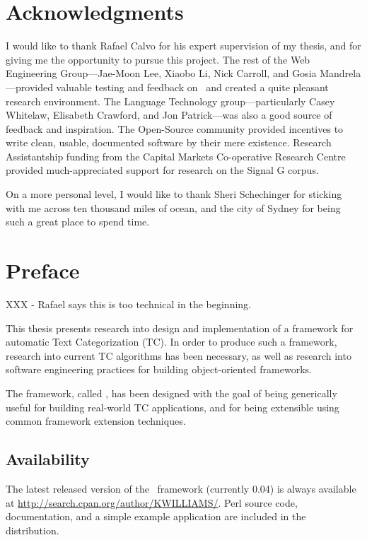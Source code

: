 \chapter{Acknowledgments}

I would like to thank Rafael Calvo for his expert supervision of my
thesis, and for giving me the opportunity to pursue this project.  The
rest of the Web Engineering Group---Jae-Moon Lee, Xiaobo Li, Nick
Carroll, and Gosia Mandrela---provided valuable testing and feedback
on \aicat\ and created a quite pleasant research environment.  The
Language Technology group---particularly Casey Whitelaw, Elisabeth
Crawford, and Jon Patrick---was also a good source of feedback and
inspiration.  The Open-Source community provided incentives to write
clean, usable, documented software by their mere existence.  Research
Assistantship funding from the Capital Markets Co-operative Research
Centre provided much-appreciated support for research on the Signal G
corpus.

On a more personal level, I would like to thank Sheri Schechinger for sticking
with me across ten thousand miles of ocean, and the city of Sydney for
being such a great place to spend time.

\chapter{Preface}

XXX - Rafael says this is too technical in the beginning.

This thesis presents research into design and implementation of a framework
for automatic Text Categorization (TC).  In order to produce such a
framework, research into current TC algorithms has been necessary, as
well as research into software engineering practices for building
object-oriented frameworks.

The framework, called \aicat, has been designed with the goal of being
generically useful for building real-world TC applications, and for
being extensible using common framework extension techniques.

\section*{Availability}

The latest released version of the \aicat\ framework (currently 0.04)
is always available at
\url{http://search.cpan.org/author/KWILLIAMS/}.  Perl source code,
documentation, and a simple example application are included in the
distribution.

